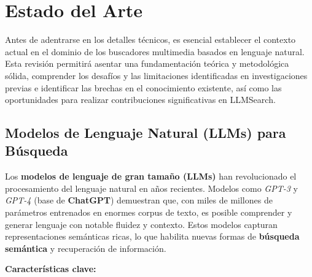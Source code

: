 
\chapter{Estado del Arte}
\label{marcoteorico}

Antes de adentrarse en los detalles técnicos, es esencial establecer el contexto actual en el dominio de los buscadores multimedia basados en lenguaje natural. Esta revisión permitirá asentar una fundamentación teórica y metodológica sólida, comprender los desafíos y las limitaciones identificadas en investigaciones previas e identificar las brechas en el conocimiento existente, así como las oportunidades para realizar contribuciones significativas en LLMSearch.

\section{Modelos de Lenguaje Natural (LLMs) para Búsqueda}

Los \textbf{modelos de lenguaje de gran tamaño (LLMs)} han revolucionado el procesamiento del lenguaje natural en años recientes. Modelos como \emph{GPT-3} y \emph{GPT-4} (base de \textbf{ChatGPT}) demuestran que, con miles de millones de parámetros entrenados en enormes corpus de texto, es posible comprender y generar lenguaje con notable fluidez y contexto. Estos modelos capturan representaciones semánticas ricas, lo que habilita nuevas formas de \textbf{búsqueda semántica} y recuperación de información.

\textbf{Características clave:}

